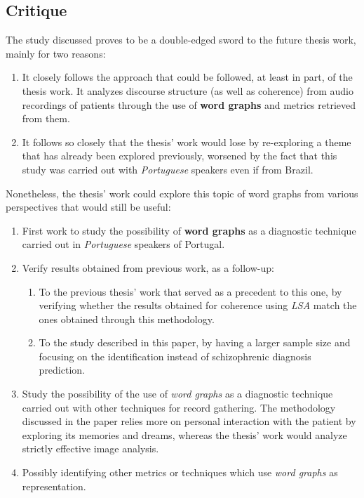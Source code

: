 \documentclass{Paper_Summary}
\begin{document}
\makepapertitle

\breakline

\begin{center}
    \section*{Critique}
\end{center}

    The study discussed proves to be a double-edged sword to the future thesis work, mainly for two reasons:
    \begin{enumerate}
        \item It closely follows the approach that could be followed, at least in part, of the thesis work. It analyzes discourse structure (as well as coherence) from audio recordings of patients through the use of \textbf{word graphs} and metrics retrieved from them.
        \item It follows so closely that the thesis' work would lose by re-exploring a theme that has already been explored previously, worsened by the fact that this study was carried out with \emph{Portuguese} speakers even if from Brazil.
    \end{enumerate}

    Nonetheless, the thesis' work could explore this topic of word graphs from various perspectives that would still be useful:
    \begin{enumerate}
        \item First work to study the possibility of \textbf{word graphs} as a diagnostic technique carried out in \emph{Portuguese} speakers of Portugal.
        \item Verify results obtained from previous work, as a follow-up:
        \begin{enumerate}
            \item To the previous thesis' work that served as a precedent to this one, by verifying whether the results obtained for coherence using \emph{LSA} match the ones obtained through this methodology.
            \item To the study described in this paper, by having a larger sample size and focusing on the identification instead of schizophrenic diagnosis prediction.
        \end{enumerate}
        \item Study the possibility of the use of \emph{word graphs} as a diagnostic technique carried out with other techniques for record gathering. The methodology discussed in the paper relies more on personal interaction with the patient by exploring its memories and dreams, whereas the thesis' work would analyze strictly effective image analysis. 
        \item Possibly identifying other metrics or techniques which use \emph{word graphs} as representation.
    \end{enumerate}
\end{document}
